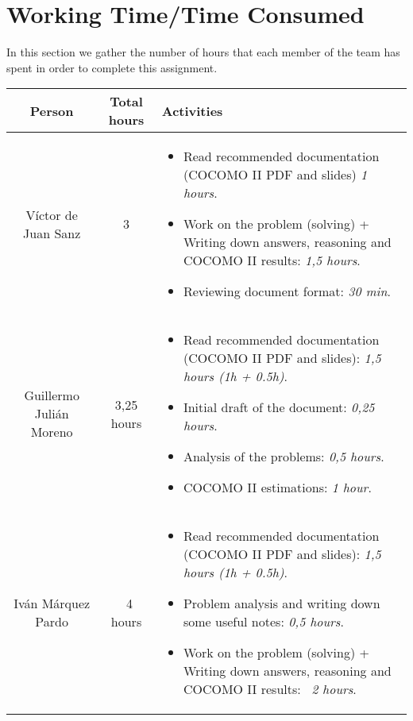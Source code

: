 \section{Working Time/Time Consumed}
In this section we gather the number of hours that each member of the team has spent in order to complete this assignment.

\begin{table}[htbp]
\begin{tabular}{|c|c|p{8cm}|} \hline
\textbf{Person} & \textbf{Total hours} & \textbf{Activities} \\ \hline
V\'ictor de Juan Sanz & 3 & \begin{itemize}
\item Read recommended documentation (COCOMO II PDF and slides) \emph{1 hours}.
\item Work on the problem (solving) + Writing down answers, reasoning and COCOMO II results: \emph{1,5 hours}.
\item Reviewing document format: \emph{30 min}.
\end{itemize} \\ \hline
Guillermo Juli\'an Moreno & 3,25 hours & \begin{itemize}
\item Read recommended documentation (COCOMO II PDF and slides): \emph{1,5 hours (1h + 0.5h)}.
\item Initial draft of the document: \emph{0,25 hours}.
\item Analysis of the problems: \emph{0,5 hours}.
\item COCOMO II estimations: \emph{1 hour}.
\end{itemize} \\ \hline
Iv\'an M\'arquez Pardo & ~4 hours & 
\begin{itemize}
\item Read recommended documentation (COCOMO II PDF and slides): \emph{1,5 hours (1h + 0.5h)}.
\item Problem analysis and writing down some useful notes: \emph{0,5 hours}.
\item Work on the problem (solving) + Writing down answers, reasoning and COCOMO II results: \emph{~2 hours}.
\end{itemize} \\ \hline
\end{tabular}
\end{table}
